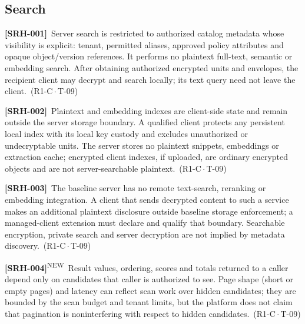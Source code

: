 \documentclass[11pt,a4paper]{article}
\newcommand{\reqtag}[2]{{\footnotesize\color{accent}(#1\,$\cdot$\,#2)}}
\newcommand{\req}[4]{\par\noindent\hypertarget{req:#1}{\textbf{[#1]}}\ #4\ \reqtag{#2}{#3}\par}
\newcommand{\reqn}[4]{\par\noindent\hypertarget{req:#1}{\textbf{[#1]}}\textsuperscript{\color{accent}\tiny NEW}\ #4\ \reqtag{#2}{#3}\par}
\begin{document}
\subsection{Search}
\req{SRH-001}{R1-C}{T-09}{Server search is restricted to authorized catalog metadata whose visibility is explicit: tenant, permitted aliases, approved policy attributes and opaque object/version references. It performs no plaintext full-text, semantic or embedding search. After obtaining authorized encrypted units and envelopes, the recipient client may decrypt and search locally; its text query need not leave the client.}
\req{SRH-002}{R1-C}{T-09}{Plaintext and embedding indexes are client-side state and remain outside the server storage boundary. A qualified client protects any persistent local index with its local key custody and excludes unauthorized or undecryptable units. The server stores no plaintext snippets, embeddings or extraction cache; encrypted client indexes, if uploaded, are ordinary encrypted objects and are not server-searchable plaintext.}
\req{SRH-003}{R1-C}{T-09}{The baseline server has no remote text-search, reranking or embedding integration. A client that sends decrypted content to such a service makes an additional plaintext disclosure outside baseline storage enforcement; a managed-client extension must declare and qualify that boundary. Searchable encryption, private search and server decryption are not implied by metadata discovery.}
\reqn{SRH-004}{R1-C}{T-09}{Result values, ordering, scores and totals returned to a caller depend only on candidates that caller is authorized to see. Page shape (short or empty pages) and latency can reflect scan work over hidden candidates; they are bounded by the scan budget and tenant limits, but the platform does not claim that pagination is noninterfering with respect to hidden candidates.}
\end{document}
